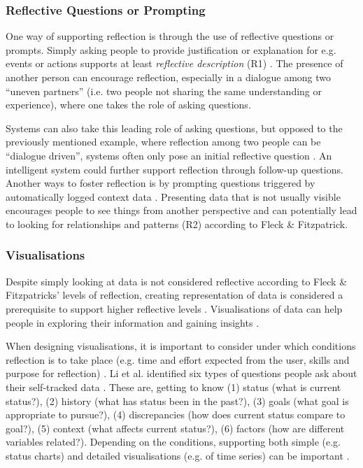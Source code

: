 \subsubsection{Reflective Questions or Prompting}
One way of supporting reflection is through the use of reflective questions or prompts. Simply asking people to provide justification or explanation for e.g. events or actions supports at least \textit{reflective description} (R1) \cite{Fleck}. The presence of another person can encourage reflection, especially in a dialogue among two “uneven partners” (i.e. two people not sharing the same understanding or experience), where one takes the role of asking questions. 

Systems can also take this leading role of asking questions, but opposed to the previously mentioned example, where reflection among two people can be “dialogue driven”, systems often only pose an initial reflective question \cite{Mols}. An intelligent system could further support reflection through follow-up questions. Another ways to foster reflection is by prompting questions triggered by automatically logged context data \cite{Fleck}. Presenting data that is not usually visible encourages people to see things from another perspective and can potentially lead to looking for relationships and patterns (R2) according to Fleck \& Fitzpatrick. 

\subsubsection{Visualisations}
Despite simply looking at data is not considered reflective according to Fleck \& Fitzpatricks’ levels of reflection, creating representation of data is considered a prerequisite to support higher reflective levels \cite{Fleck}. Visualisations of data can help people in exploring their information and gaining insights \cite{Li2010, Choe2014}. 

When designing visualisations, it is important to consider under which conditions reflection is to take place (e.g. time and effort expected from the user, skills and purpose for reflection) \cite{Cuttone, Muller}. Li et al. identified six types of questions people ask about their self-tracked data \cite{Li2011}. These are, getting to know (1) status (what is current status?), (2) history (what has status been in the past?), (3) goals (what goal is appropriate to pursue?), (4) discrepancies (how does current status compare to goal?), (5) context (what affects current status?), (6) factors (how are different variables related?). Depending on the conditions, supporting both simple (e.g. status charts) and detailed visualisations (e.g. of time series) can be important \cite{Muller, Cuttone}.

